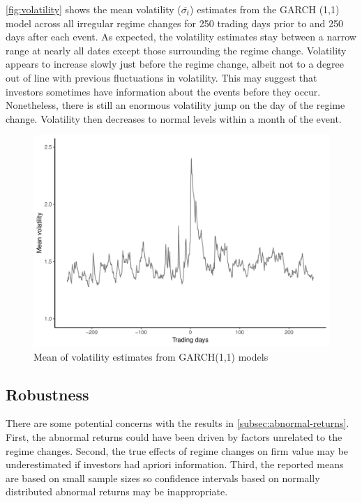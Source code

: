 \documentclass[12pt,final,fleqn]{article}
\theoremstyle{plain}
\begin{document}
\autoref{fig:volatility} shows the mean volatility ($\overline{\sigma_t}$) estimates from the GARCH (1,1) model across all irregular regime changes for 250 trading days prior to and 250 days after each event. As expected, the volatility estimates stay between a narrow range at nearly all dates except those surrounding the regime change. Volatility appears to increase slowly just before the regime change, albeit not to a degree out of line with previous fluctuations in volatility. This may suggest that investors sometimes have information about the events before they occur. Nonetheless, there is still an enormous volatility jump on the day of the regime change. Volatility then decreases to normal levels within a month of the event.

\begin{figure}[!htb]
\includegraphics{../figs/mean-volatility.pdf}
\caption{Mean of volatility estimates from GARCH(1,1) models}
\label{fig:volatility}
\end{figure}

\subsection{Robustness} \label{subsec: Robustness}
There are some potential concerns with the results in \autoref{subsec:abnormal-returns}. First, the abnormal returns could have been driven by factors unrelated to the regime changes.  Second, the true effects of regime changes on firm value may be underestimated if investors had apriori information. Third, the reported means are based on small sample sizes so confidence intervals based on normally distributed abnormal returns may be inappropriate.
\end{document}
